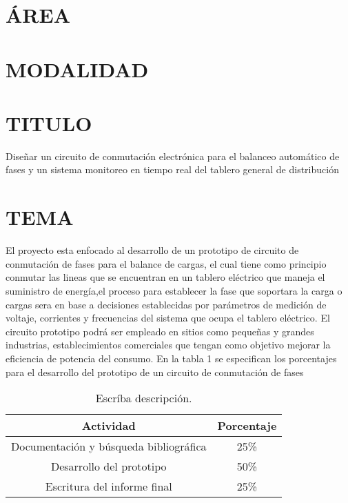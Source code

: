 \documentclass[12pt,letterpaper]{article}
\begin{document}
\section{ÁREA}

\section{MODALIDAD}

\section{TITULO}
Diseñar un circuito de conmutación electrónica para el balanceo automático de fases y  un sistema monitoreo en tiempo real del tablero general de distribución

\section{TEMA}
El proyecto esta enfocado al desarrollo de un prototipo de  circuito de conmutación de fases para el balance de cargas, el cual tiene como principio conmutar  las lineas que se encuentran en un tablero eléctrico que maneja el suministro de energía,el proceso para establecer la fase que soportara la carga o cargas sera en base a decisiones establecidas por parámetros de medición de voltaje, corrientes y frecuencias del sistema que ocupa el tablero eléctrico.
El circuito prototipo podrá ser empleado en sitios como pequeñas y grandes  industrias, establecimientos comerciales que tengan como objetivo mejorar la eficiencia de potencia del consumo.
En la tabla 1 se especifican los porcentajes para el desarrollo del prototipo de un circuito de conmutación de fases           
	\begin{table}[htb]
	\caption{Escríba descripción.} %
	\label{tab:desarrollo}	
	\begin{center}
		\begin{tabular}{|c|c|}
			\hline
			Actividad & Porcentaje \\\hline \hline
			Documentación y búsqueda bibliográfica & 25\% \\
			Desarrollo del prototipo  & 50\% \\
			Escritura del informe final  & 25\% \\
			\hline
		\end{tabular}
	\end{center}
\end{table} 
\end{document}
